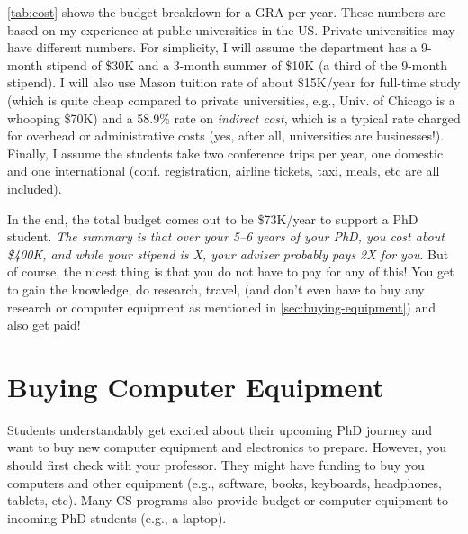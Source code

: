 \documentclass[oneside,11pt,dvipsnames]{book}
\newcommand{\mycomment}[3][\color{blue}]{{#1{{#2}: {#3}}}}
\newcommand{\tvn}[1]{\mycomment{TVN}{#1}}{}
\begin{document}
\autoref{tab:cost} shows the budget breakdown for a GRA per year.
These numbers are based on my experience at public universities in the US. Private universities may have different numbers.  For simplicity, I will assume the department has a 9-month stipend of \$30K and a 3-month summer of \$10K (a third of the 9-month stipend). I will also use Mason tuition rate of about \$15K/year for full-time study (which is quite cheap compared to private universities, e.g., Univ. of Chicago is a whooping \$70K) and a 58.9\% rate on \emph{indirect cost}, which is a typical rate charged for overhead or administrative costs (yes, after all, universities are businesses!).  Finally, I assume the students take two conference trips per year, one domestic and one international (conf. registration, airline tickets, taxi, meals, etc are all included).

In the end, the total budget comes out to be \$73K/year to support a PhD student. \emph{The summary is that over your 5--6 years of your PhD, you cost about \$400K, and while your stipend is X, your adviser probably pays 2X for you}. But of course, the nicest thing is that you do not have to pay for any of this! You get to gain the knowledge, do research, travel, (and don't even have to buy any research or computer equipment as mentioned in \autoref{sec:buying-equipment}) and also get paid!




\section{Buying Computer Equipment}\label{sec:buying-equipment}

Students understandably get excited about their upcoming PhD journey and want to buy new computer equipment and electronics to prepare. However, you should first check with your professor.  They might have funding to buy you computers and other equipment (e.g., software, books, keyboards, headphones, tablets, etc). Many CS programs also provide budget or computer equipment to incoming PhD students (e.g., a laptop). 
\end{document}

